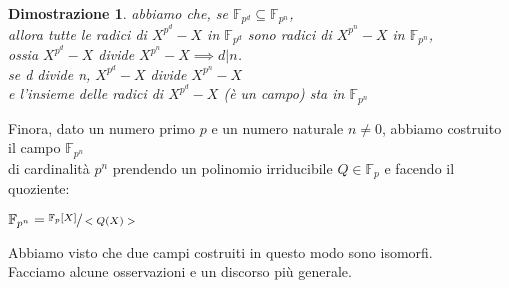 \documentclass[a4paper,12pt]{article}
\theoremstyle{def}
\theoremstyle{prop}
\theoremstyle{esempio}
\theoremstyle{dimostrazione}
\newtheorem*{dimostrazione}{Dimostrazione}
\theoremstyle{teo}
\theoremstyle{osservazione}
\begin{document}
\begin{dimostrazione}
	abbiamo che, se \(\mathbb{F}_{p^d} \subseteq \mathbb{F}_{p^n}\),\\
	allora tutte le radici di \(X^{p^d} - X\) in \(\mathbb{F}_{p^d}\) sono radici di \(X^{p^n} - X\) in \(\mathbb{F}_{p^n}\),\\
	ossia \(X^{p^d} - X\) divide \(X^{p^n} - X \implies d | n\).\\
	se d divide n, \(X^{p^d} - X \) divide \(X^{p^n} - X\)\\
	e l'insieme delle radici di \(X^{p^d} - X\) (è un campo) sta in \(\mathbb{F}_{p^n}\)\\
\end{dimostrazione}

\vspace{\baselineskip}

Finora, dato un numero primo \(p\) e un numero naturale \(n \neq 0\), abbiamo costruito il campo \(\mathbb{F}_{p^n}\)\\
di cardinalità \(p^n\) prendendo un polinomio irriducibile \(Q \in \mathbb{F}_p\) e facendo il quoziente:
\begin{center}
	\(\mathbb{F}_{p^n} = \sfrac{\mathbb{F}_p[X]}{<Q(X)>}\)
\end{center}
Abbiamo visto che due campi costruiti in questo modo sono isomorfi.\\
Facciamo alcune osservazioni e un discorso più generale.\\
\end{document}
